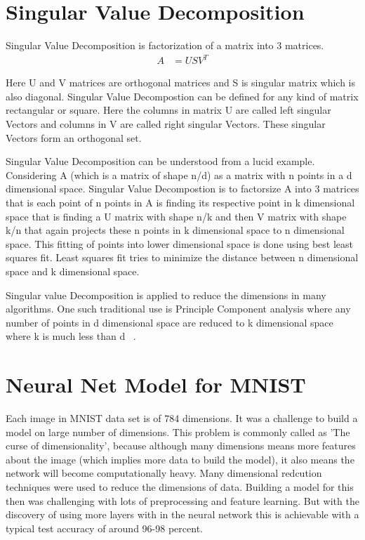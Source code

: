 \section{Singular Value Decomposition}

Singular Value Decomposition is factorization of a matrix into 3 matrices.
\begin{align*}  
A&=USV^{T}  
\end{align*}

Here U and V matrices are orthogonal matrices and S is singular matrix which is
also diagonal. Singular Value Decompostion can be defined for any kind of matrix
rectangular or square. Here the columns in matrix U are called left singular
Vectors and columns in V are called right singular Vectors. These singular
Vectors form an orthogonal set. 
   
Singular Value Decomposition can be understood from a lucid example. Considering
A (which is a matrix of shape n/d) as a matrix with n points in a d dimensional
space. Singular Value Decompostion is to factorsize A into 3 matrices that is
each point of n points in A is finding its respective point in k dimensional
space that is finding a U matrix with shape n/k and then V matrix with shape k/n
that again projects these n points in k dimensional space to n dimensional
space. This fitting of points into lower dimensional space is done using best
least squares fit. Least squares fit tries to minimize the distance between n
dimensional space and k dimensional space.

Singular value Decomposition is applied to reduce the dimensions in many
algorithms. One such traditional use is Principle Component analysis where any
number of points in d dimensional space are reduced to k dimensional space where
k is much less than d ~\cite{hid-sp18-401-svd}.

\section{Neural Net Model for MNIST}

Each image in MNIST data set is of 784 dimensions. It was a challenge to build
a model on large number of dimensions. This problem is commonly called as 'The
curse of dimensionality', because although many dimensions means more features
about the image (which implies more data to build the model), it also means
the network will become computationally heavy. Many dimensional redcution
techniques were used to reduce the dimensions of data. Building a model for
this then was challenging with lots of preprocessing and feature learning. But
with the discovery of using more layers with in the neural network this is
achievable with a typical test accuracy of around 96-98 percent.

